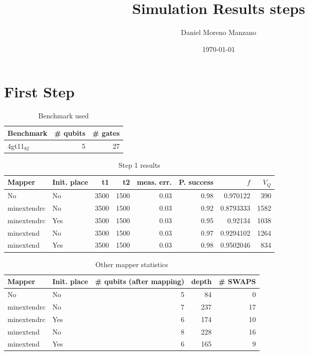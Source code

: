 \documentclass[11pt]{article}
\author{Daniel Moreno Manzano}
\date{\today}
\title{Simulation Results steps}
\begin{document}
\maketitle


\section{First Step}
\label{sec:orge5dcca4}

\begin{table}[htbp]
\caption{\label{tab:orgb78931c}
Benchmark used}
\centering
\begin{tabular}{lrr}
\hline
Benchmark & \# qubits & \# gates\\
\hline
4gt11\(_{\text{82}}\) & 5 & 27\\
\hline
\end{tabular}
\end{table}

\begin{table}[htbp]
\caption{\label{tab:org35742d1}
Step 1 results}
\centering
\begin{tabular}{llrrrrrr}
\hline
Mapper & Init. place & t1 & t2 & meas. err. & P. success & \(f\) & \(V_Q\)\\
\hline
No & No & 3500 & 1500 & 0.03 & 0.98 & 0.970122 & 390\\
minextendrc & No & 3500 & 1500 & 0.03 & 0.92 & 0.8793333 & 1582\\
minextendrc & Yes & 3500 & 1500 & 0.03 & 0.95 & 0.92134 & 1038\\
minextend & No & 3500 & 1500 & 0.03 & 0.97 & 0.9294102 & 1264\\
minextend & Yes & 3500 & 1500 & 0.03 & 0.98 & 0.9502046 & 834\\
\hline
\end{tabular}
\end{table}

\begin{table}[htbp]
\caption{\label{tab:orgb1b5be4}
Other mapper statistics}
\centering
\begin{tabular}{llrrr}
\hline
Mapper & Init. place & \# qubits (after mapping) & depth & \# SWAPS\\
\hline
No & No & 5 & 84 & 0\\
minextendrc & No & 7 & 237 & 17\\
minextendrc & Yes & 6 & 174 & 10\\
minextend & No & 8 & 228 & 16\\
minextend & Yes & 6 & 165 & 9\\
\hline
\end{tabular}
\end{table}
\end{document}
